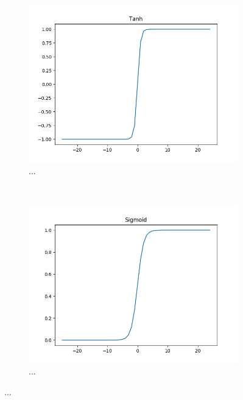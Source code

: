 \begin{figure}[t!]
\begin{subfigure}[t]{0.5\textwidth}
		\includegraphics[width=\textwidth]{img/methodology_neuralNetwork_activationFunction_tanh.png}
		\caption{...}
	\end{subfigure}%
	~ 
	\begin{subfigure}[t]{0.5\textwidth}
		\centering
		\includegraphics[width=\textwidth]{img/methodology_neuralNetwork_activationFunction_sigmoid.png}
		\caption{...}
	\end{subfigure}
\end{figure}

